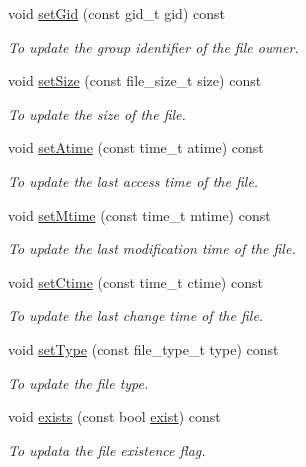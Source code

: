 \begin{DoxyCompactItemize}
void \hyperlink{classFile_a45b2b29b558a910648ac4077a7c26aae}{setGid} (const gid\_\-t gid) const 
\begin{DoxyCompactList}\small\item\em To update the group identifier of the file owner. \item\end{DoxyCompactList}\item 
void \hyperlink{classFile_a468b86e87c939649a4ec0939bd8cafa0}{setSize} (const file\_\-size\_\-t size) const 
\begin{DoxyCompactList}\small\item\em To update the size of the file. \item\end{DoxyCompactList}\item 
void \hyperlink{classFile_a066d14d55524520404641b26027ca815}{setAtime} (const time\_\-t atime) const 
\begin{DoxyCompactList}\small\item\em To update the last access time of the file. \item\end{DoxyCompactList}\item 
void \hyperlink{classFile_a3d419f6b7306952fdc0b73093ce7920c}{setMtime} (const time\_\-t mtime) const 
\begin{DoxyCompactList}\small\item\em To update the last modification time of the file. \item\end{DoxyCompactList}\item 
void \hyperlink{classFile_aaa8808f7df137f5460f2a06835b65930}{setCtime} (const time\_\-t ctime) const 
\begin{DoxyCompactList}\small\item\em To update the last change time of the file. \item\end{DoxyCompactList}\item 
void \hyperlink{classFile_a590877c07f2214045644e7daa77ca7bc}{setType} (const file\_\-type\_\-t type) const 
\begin{DoxyCompactList}\small\item\em To update the file type. \item\end{DoxyCompactList}\item 
void \hyperlink{classFile_a3dc1f3dc8c88a37d5b99499e4db75c3b}{exists} (const bool \hyperlink{classFile_a7551ebf856afc07947078a4cb3a2823f}{exist}) const 
\begin{DoxyCompactList}\small\item\em To updata the file existence flag. \item\end{DoxyCompactList}\end{DoxyCompactItemize}
